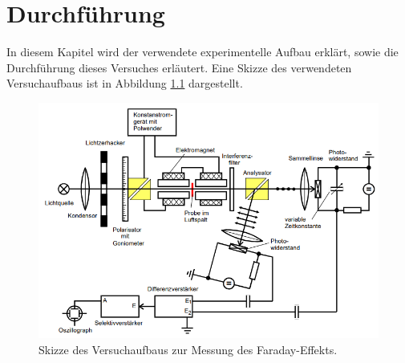 \chapter{Durchführung}
\label{cha:Durchführung}
In diesem Kapitel wird der verwendete experimentelle Aufbau erklärt, sowie die Durchführung dieses Versuches erläutert. Eine Skizze des verwendeten Versuchaufbaus ist in Abbildung 
\ref{fig:skizze_aufbau} dargestellt.

\begin{figure}
              \centering
              \includegraphics[width = \textwidth]{content/aufbau_skizze.PNG}
              \caption{Skizze des Versuchaufbaus zur Messung des Faraday-Effekts. \cite{v46}}
              \label{fig:skizze_aufbau}
\end{figure}

